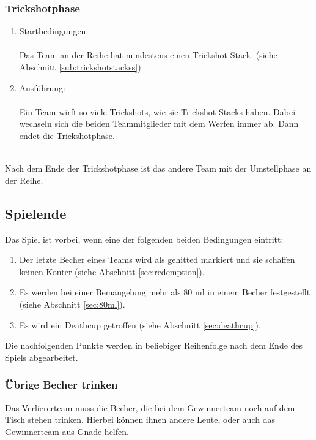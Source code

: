 \documentclass[a5paper, 12pt]{book}
\begin{document}
\subsubsection{Trickshotphase}\label{subsub:Trickshotphase}
\begin{enumerate} [(1)]
    \item Startbedingungen:\\\\
    Das Team an der Reihe hat mindestens einen Trickshot Stack. (siehe Abschnitt \ref{sub:trickshotstackss})
    \item Ausführung:\\\\
    Ein Team wirft so viele Trickshots, wie sie Trickshot Stacks haben. Dabei wechseln sich die beiden Teammitglieder mit dem Werfen immer ab. Dann endet die Trickshotphase. \\\\
\end{enumerate}
Nach dem Ende der Trickshotphase ist das andere Team mit der Umstellphase an der Reihe.
\subsection{Spielende}\label{sub:spielende}
Das Spiel ist vorbei, wenn eine der folgenden beiden Bedingungen eintritt:
\begin{enumerate}[(1)]
    \item Der letzte Becher eines Teams wird als gehitted markiert und sie schaffen keinen Konter (siehe Abschnitt \ref{sec:redemption}).
    \item Es werden bei einer Bemängelung mehr als 80 ml in einem Becher festgestellt (siehe Abschnitt \ref{sec:80ml}).
    \item Es wird ein Deathcup getroffen (siehe Abschnitt \ref{sec:deathcup}).
\end{enumerate}
Die nachfolgenden Punkte werden in beliebiger Reihenfolge nach dem Ende des Spiels abgearbeitet.
\subsubsection{Übrige Becher trinken}\label{subsub:übrigebechertrinken}
Das Verliererteam muss die Becher, die bei dem Gewinnerteam noch auf dem Tisch stehen trinken. Hierbei können ihnen andere Leute, oder auch das Gewinnerteam aus Gnade helfen.
\end{document}
